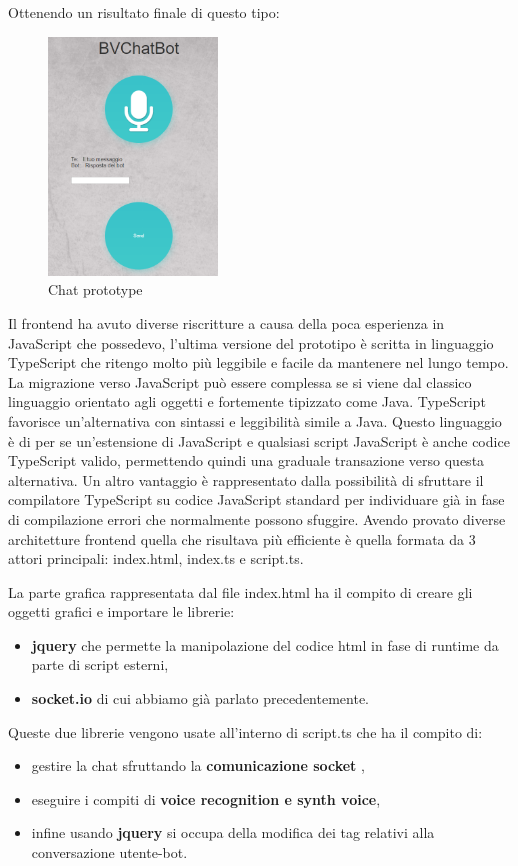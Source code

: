 Ottenendo un risultato finale di questo tipo:
\begin{figure}[H]
 \centering
  \includegraphics[width=0.4\textwidth]{img/prototype.png}
 \caption{Chat prototype}
\end{figure}
Il frontend ha avuto diverse riscritture a causa della poca esperienza in JavaScript che possedevo, l'ultima versione del prototipo è scritta in linguaggio TypeScript che ritengo molto più leggibile e facile da mantenere nel lungo tempo.
La migrazione verso JavaScript può essere complessa se si viene dal classico linguaggio orientato agli oggetti e fortemente tipizzato come Java.
TypeScript favorisce un'alternativa con sintassi e leggibilità simile a Java.
Questo linguaggio è di per se un'estensione di JavaScript e qualsiasi script JavaScript è anche codice TypeScript valido, permettendo quindi una graduale transazione verso questa alternativa.
Un altro vantaggio è rappresentato dalla possibilità di sfruttare il compilatore TypeScript su codice JavaScript standard per individuare già in fase di compilazione errori che normalmente possono sfuggire.
Avendo provato diverse architetture frontend quella che risultava più efficiente è quella formata da 3 attori principali: index.html, index.ts e script.ts.

La parte grafica rappresentata dal file index.html ha il compito di creare gli oggetti grafici e importare le librerie:
\begin{itemize}
\item \textbf{jquery} che permette la manipolazione del codice html in fase di runtime da parte di script esterni,
\item \textbf{socket.io} di cui abbiamo già parlato precedentemente.
\end{itemize}
Queste due librerie vengono usate all'interno di script.ts che ha il compito di:
\begin{itemize}
\item gestire la chat sfruttando la \textbf{comunicazione socket} ,
\item eseguire i compiti di \textbf{voice recognition e synth voice},
\item infine usando \textbf{jquery} si occupa della modifica dei tag relativi alla conversazione utente-bot.
\end{itemize}
